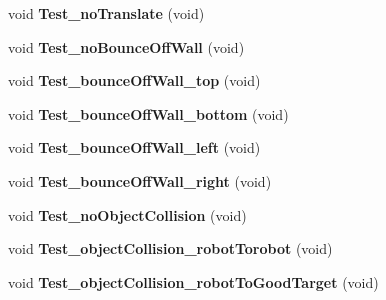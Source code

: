 \begin{DoxyCompactItemize}
\item 
\hypertarget{classEnvironmentClassTests_a51b0de317394d1d0f5ec255b31a1c9f0}{void {\bfseries Test\-\_\-no\-Translate} (void)}\label{classEnvironmentClassTests_a51b0de317394d1d0f5ec255b31a1c9f0}

\item 
\hypertarget{classEnvironmentClassTests_a19baaa41b0f95e056510991bbce93d7e}{void {\bfseries Test\-\_\-no\-Bounce\-Off\-Wall} (void)}\label{classEnvironmentClassTests_a19baaa41b0f95e056510991bbce93d7e}

\item 
\hypertarget{classEnvironmentClassTests_af4647a05665fbdb06200614b2d763e0c}{void {\bfseries Test\-\_\-bounce\-Off\-Wall\-\_\-top} (void)}\label{classEnvironmentClassTests_af4647a05665fbdb06200614b2d763e0c}

\item 
\hypertarget{classEnvironmentClassTests_a0bd6eec2d0e58bebddc34dfc52e1caf2}{void {\bfseries Test\-\_\-bounce\-Off\-Wall\-\_\-bottom} (void)}\label{classEnvironmentClassTests_a0bd6eec2d0e58bebddc34dfc52e1caf2}

\item 
\hypertarget{classEnvironmentClassTests_a778846d9d3c958fa931a10538dab0f8d}{void {\bfseries Test\-\_\-bounce\-Off\-Wall\-\_\-left} (void)}\label{classEnvironmentClassTests_a778846d9d3c958fa931a10538dab0f8d}

\item 
\hypertarget{classEnvironmentClassTests_ad4a91736a8e58b2b34c05a13c59149ea}{void {\bfseries Test\-\_\-bounce\-Off\-Wall\-\_\-right} (void)}\label{classEnvironmentClassTests_ad4a91736a8e58b2b34c05a13c59149ea}

\item 
\hypertarget{classEnvironmentClassTests_a46677252a962ebeba27c08bb6bf08f9e}{void {\bfseries Test\-\_\-no\-Object\-Collision} (void)}\label{classEnvironmentClassTests_a46677252a962ebeba27c08bb6bf08f9e}

\item 
\hypertarget{classEnvironmentClassTests_a00effa54c813ca737b19b80b20703d15}{void {\bfseries Test\-\_\-object\-Collision\-\_\-robot\-Torobot} (void)}\label{classEnvironmentClassTests_a00effa54c813ca737b19b80b20703d15}

\item 
\hypertarget{classEnvironmentClassTests_af986ee7e74b79f24cef81a671c3e0916}{void {\bfseries Test\-\_\-object\-Collision\-\_\-robot\-To\-Good\-Target} (void)}\label{classEnvironmentClassTests_af986ee7e74b79f24cef81a671c3e0916}


\end{DoxyCompactItemize}
